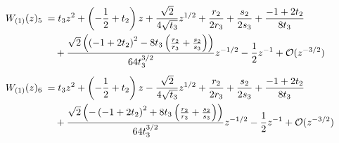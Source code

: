\begin{sheetasymptotics}
\begin{align*}
        \sheetlabel{W_{(1)}(z)_{5}} & ={}t_3z^{2}+\left(- \frac{1}{2} + t_2\right)z+\frac{\sqrt{2}}{4 \sqrt{t_3}}z^{1/2}+\frac{r_2}{2 r_3} + \frac{s_2}{2 s_3} + \frac{-1 + 2 t_2}{8 t_3} \\*
                                    & \quad{}+\frac{\sqrt{2} \left(\left(-1 + 2 t_2\right)^{2} - 8 t_3 \left(\frac{r_2}{r_3} + \frac{s_2}{s_3}\right)\right)}{64 t_3^{3/2}}z^{-1/2}-\frac{1}{2}z^{-1}+\mathcal O(z^{-3/2}) \\[4pt]
        \sheetlabel{W_{(1)}(z)_{6}} & ={}t_3z^{2}+\left(- \frac{1}{2} + t_2\right)z-\frac{\sqrt{2}}{4 \sqrt{t_3}}z^{1/2}+\frac{r_2}{2 r_3} + \frac{s_2}{2 s_3} + \frac{-1 + 2 t_2}{8 t_3} \\*
                                    & \quad{}+\frac{\sqrt{2} \left(- \left(-1 + 2 t_2\right)^{2} + 8 t_3 \left(\frac{r_2}{r_3} + \frac{s_2}{s_3}\right)\right)}{64 t_3^{3/2}}z^{-1/2}-\frac{1}{2}z^{-1}+\mathcal O(z^{-3/2})
    \end{align*}
\end{sheetasymptotics}
